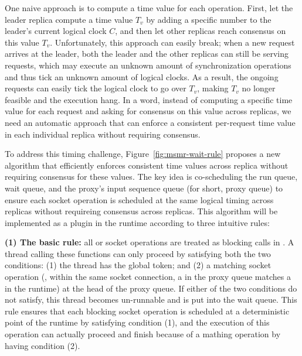 One naive approach is to compute a time value for each operation. First, let the
leader replica compute a time value $T_{v}$ by adding a specific number to the
leader's current logical clock $C$, and then let other replicas reach consensus
on this value $T_{v}$. Unfortunately, this approach can easily break; when a new
request arrives at the leader, both the leader and the other replicas can still
be serving requests, which may execute an unknown amount of synchronization
operations and thus tick an unknown amount of logical clocks. As a result, the
ongoing requests can easily tick the logical clock to go over $T_{v}$, making
$T_{v}$ no longer feasible and the execution hang. In a word, instead of
computing a specific time value for each request and asking for consensus on
this value across replicas, we need an automatic approach that can enforce a
consistent per-request time value in each individual replica without requiring
consensus.



To address this timing challenge, Figure~\ref{fig:msmr-wait-rule} proposes a new
algorithm that efficiently enforces consistent time values across replica
without requiring consensus for these values. The key idea is co-scheduling the
\parrot run queue, wait queue, and the proxy's input sequence queue (for short,
proxy queue) to ensure each socket operation is scheduled at the same logical
timing across replicas without requireing consensus across replicas. This
algorithm will be implemented as a plugin in the \parrot runtime according to
three intuitive rules:

\textbf{(1) The basic rule:} all \recv or \select socket operations are treated
as blocking calls in \parrot. A thread calling these functions can only proceed
by satisfying both the two conditions: (1) the thread has the \parrot global
token; and (2) a matching socket operation (\eg, within the same socket
connection, a \send in the proxy queue matches a \recv in the \parrot runtime)
at the head of the proxy queue. If either of the two conditions do not satisfy,
this thread becomes un-runnable and is put into the \parrot wait queue. This
rule ensures that each blocking socket operation is scheduled at a deterministic
point of the \parrot runtime by satisfying condition (1), and the execution of
this operation can actually proceed and finish because of a mathing operation by
having condition (2).

